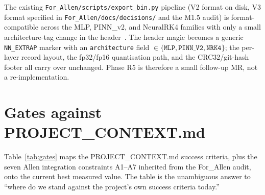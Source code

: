 \documentclass[11pt,a4paper]{article}
\begin{document}
The existing \texttt{For\_Allen/scripts/export\_bin.py} pipeline
(V2 format on disk, V3 format specified in
\texttt{For\_Allen/docs/decisions/} and the M1.5 audit) is
format-compatible across the MLP, PINN\_v2, and NeuralRK4 families
with only a small architecture-tag change in the
header~\cite{gen3readme, cleanuplist}. The header magic becomes a
generic \texttt{NN\_EXTRAP} marker with an \texttt{architecture}
field $\in \{\texttt{MLP}, \texttt{PINN\_V2},
\texttt{NRK4}\}$; the per-layer record layout, the fp32/fp16
quantisation path, and the CRC32/git-hash footer all carry over
unchanged. Phase R5 is therefore a small follow-up MR, not a
re-implementation.

\section{Gates against PROJECT\_CONTEXT.md}\label{sec:gates}

Table~\ref{tab:gates} maps the PROJECT\_CONTEXT.md success criteria,
plus the seven Allen integration constraints A1--A7 inherited from
the For\_Allen audit, onto the current best measured value. The
table is the unambiguous answer to ``where do we stand against the
project's own success criteria today.''
\end{document}
